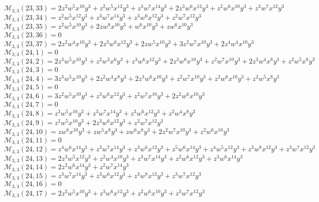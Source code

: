 \documentclass[12pt]{memoireuqam1.3}
\begin{document}
$\mathcal{M}_{3,3}(23,33)=2z^2w^5x^{10}y^3+z^2w^5x^{12}y^3+z^3w^7x^{14}y^3+2z^3w^6x^{12}y^3+z^2w^6x^{10}y^3+z^3w^7x^{12}y^3$\\
$\mathcal{M}_{3,3}(23,34)=z^2w^5x^{12}y^3+z^3w^7x^{14}y^3+z^3w^6x^{12}y^3+z^2w^7x^{12}y^3$\\
$\mathcal{M}_{3,3}(23,35)=z^2w^5x^{10}y^3+2zw^8x^{10}y^3+w^6x^{10}y^3+zw^6x^{10}y^3$\\
$\mathcal{M}_{3,3}(23,36)=0$\\
$\mathcal{M}_{3,3}(23,37)=2z^2w^4x^{10}y^3+2z^3w^6x^{12}y^3+2zw^5x^{10}y^3+3z^2w^7x^{10}y^3+2z^4w^4x^{10}y^3$\\
$\mathcal{M}_{3,3}(24,1)=0$\\
$\mathcal{M}_{3,3}(24,2)=2z^3w^5x^{10}y^3+z^2w^3x^6y^3+z^3w^6x^{12}y^3+2z^3w^6x^{10}y^3+z^2w^7x^{10}y^3+2z^3w^4x^8y^3+z^2w^5x^8y^3$\\
$\mathcal{M}_{3,3}(24,3)=0$\\
$\mathcal{M}_{3,3}(24,4)=3z^3w^5x^{10}y^3+2z^2w^4x^8y^3+2z^3w^6x^{10}y^3+z^2w^7x^{10}y^3+z^2w^6x^{10}y^3+z^2w^5x^8y^3$\\
$\mathcal{M}_{3,3}(24,5)=0$\\
$\mathcal{M}_{3,3}(24,6)=3z^2w^5x^{10}y^3+z^3w^6x^{12}y^3+z^2w^7x^{10}y^3+2z^2w^6x^{10}y^3$\\
$\mathcal{M}_{3,3}(24,7)=0$\\
$\mathcal{M}_{3,3}(24,8)=z^3w^5x^{10}y^3+z^3w^7x^{14}y^3+z^3w^6x^{12}y^3+z^2w^4x^8y^3$\\
$\mathcal{M}_{3,3}(24,9)=z^2w^5x^{10}y^3+2z^3w^6x^{12}y^3+z^2w^7x^{12}y^3$\\
$\mathcal{M}_{3,3}(24,10)=zw^8x^{10}y^3+zw^5x^8y^3+zw^6x^8y^3+2z^2w^7x^{10}y^3+z^2w^6x^{10}y^3$\\
$\mathcal{M}_{3,3}(24,11)=0$\\
$\mathcal{M}_{3,3}(24,12)=z^4w^6x^{14}y^3+z^3w^7x^{14}y^3+z^3w^6x^{12}y^3+z^5w^6x^{14}y^3+z^4w^5x^{12}y^3+z^3w^8x^{12}y^3+z^3w^7x^{12}y^3$\\
$\mathcal{M}_{3,3}(24,13)=2z^3w^5x^{12}y^3+z^2w^4x^{10}y^3+z^3w^7x^{14}y^3+z^2w^6x^{12}y^3+z^3w^6x^{14}y^3$\\
$\mathcal{M}_{3,3}(24,14)=2z^2w^6x^{14}y^3+z^2w^7x^{14}y^3$\\
$\mathcal{M}_{3,3}(24,15)=z^3w^7x^{14}y^3+z^3w^6x^{12}y^3+z^3w^8x^{12}y^3+z^3w^7x^{12}y^3$\\
$\mathcal{M}_{3,3}(24,16)=0$\\
$\mathcal{M}_{3,3}(24,17)=2z^2w^5x^{10}y^3+z^3w^6x^{12}y^3+z^2w^6x^{10}y^3+z^3w^7x^{12}y^3$\\
\end{document}
